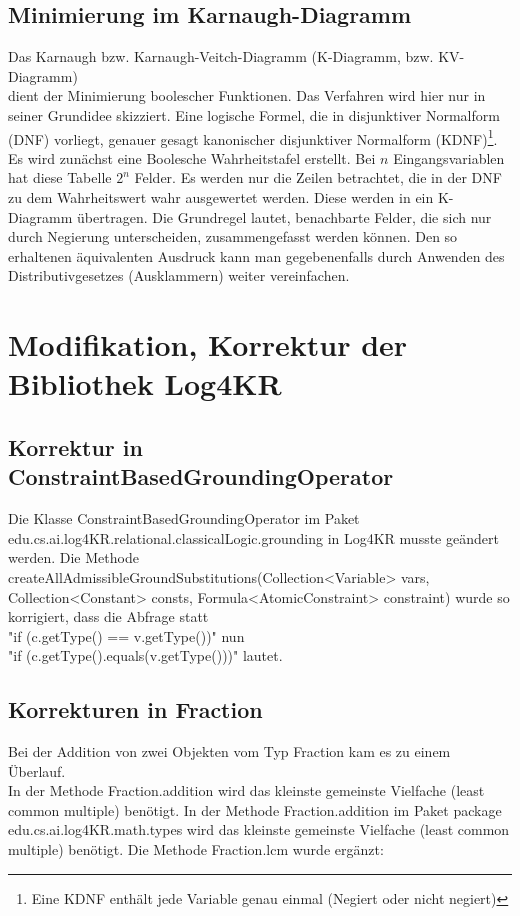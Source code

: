 \documentclass[a4paper, 11pt]{book}
\begin{document}
{	\section{Minimierung im Karnaugh-Diagramm}\label{Min_K_Dia} 
	Das Karnaugh bzw. Karnaugh-Veitch-Diagramm (K-Diagramm, bzw. KV-Diagramm) \\ dient der Minimierung boolescher Funktionen. Das Verfahren wird hier nur in seiner Grundidee skizziert. Eine logische Formel, die in disjunktiver Normalform (DNF) vorliegt, genauer gesagt kanonischer disjunktiver Normalform (KDNF)\footnote{Eine KDNF enthält jede Variable genau einmal (Negiert oder nicht negiert)}. Es wird zunächst eine Boolesche Wahrheitstafel erstellt. Bei $ n $ Eingangsvariablen hat diese Tabelle $ 2^{n} $ Felder. Es werden nur die Zeilen betrachtet, die in der DNF zu dem Wahrheitswert wahr ausgewertet werden. Diese werden in ein K-Diagramm übertragen.  Die Grundregel lautet, benachbarte Felder, die sich nur durch Negierung unterscheiden, zusammengefasst werden können. Den so erhaltenen äquivalenten Ausdruck kann man gegebenenfalls durch Anwenden des Distributivgesetzes (Ausklammern) weiter vereinfachen.

\chapter{Modifikation, Korrektur der Bibliothek Log4KR} \label{Modifikaiton Log4KR}
\section{Korrektur in ConstraintBasedGroundingOperator}
\label{sec:Korrektur1}
Die Klasse ConstraintBasedGroundingOperator im Paket\\ edu.cs.ai.log4KR.relational.classicalLogic.grounding in Log4KR musste geändert werden. Die Methode createAllAdmissibleGroundSubstitutions(Collection<Variable> vars,
Collection<Constant> consts, Formula<AtomicConstraint> constraint) wurde so korrigiert, dass die Abfrage statt\\
 "{}if (c.getType() == v.getType())"{} 
nun \\
"{}if (c.getType().equals(v.getType()))"{} lautet.

\section{Korrekturen in Fraction} \label{Korrektur_Fraction}
Bei der Addition von zwei Objekten vom Typ Fraction kam es zu einem Überlauf.\\
In der Methode Fraction.addition wird das kleinste gemeinste Vielfache (least common multiple) benötigt. 
In der Methode Fraction.addition im Paket package \\edu.cs.ai.log4KR.math.types wird das kleinste gemeinste Vielfache (least common multiple) benötigt. 
Die Methode Fraction.lcm wurde ergänzt:\\

}
\end{document}
